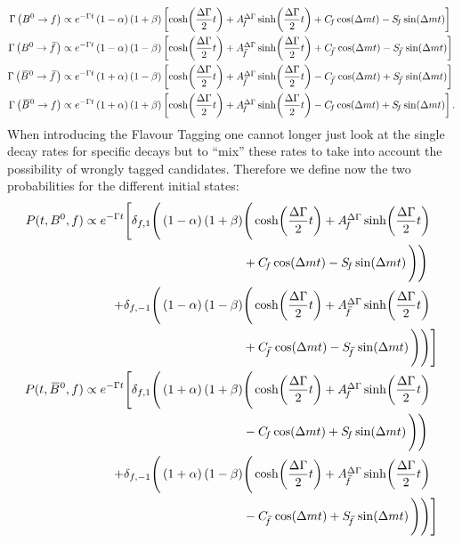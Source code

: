 \begin{align}
  \Gamma\left(\Bz\to f\right) &\propto e^{-\Gamma t}\left(1-\alpha\right)\left(1+\beta\right)\left[\cosh\!\left(\frac{\Delta\Gamma}{2}t\right)
  +\ADGf\sinh\!\left(\frac{\Delta\Gamma}{2}t\right)+\Cf\cos\!\left(\Delta mt\right)-\Sf\sin\!\left(\Delta mt\right)\right]\label{eq:asymmetries_one}\\
  \Gamma\left(\Bz\to \fbar\right) &\propto e^{-\Gamma t}\left(1-\alpha\right)\left(1-\beta\right)\left[\cosh\!\left(\frac{\Delta\Gamma}{2}t\right)
  +\ADGfbar\sinh\!\left(\frac{\Delta\Gamma}{2}t\right)+\Cfbar\cos\!\left(\Delta mt\right)-\Sfbar\sin\!\left(\Delta mt\right)\right]
  \label{eq:asymmetries_two}\\
  \Gamma\left(\Bzb\to \fbar\right) &\propto e^{-\Gamma t}\left(1+\alpha\right)\left(1-\beta\right)\left[\cosh\!\left(\frac{\Delta\Gamma}{2}t\right)
  +\ADGfbar\sinh\!\left(\frac{\Delta\Gamma}{2}t\right)-\Cfbar\cos\!\left(\Delta mt\right)+\Sfbar\sin\!\left(\Delta mt\right)\right]
  \label{eq:asymmetries_three}\\
  \Gamma\left(\Bzb\to f\right) &\propto e^{-\Gamma t}\left(1+\alpha\right)\left(1+\beta\right)\left[\cosh\!\left(\frac{\Delta\Gamma}{2}t\right)
  +\ADGf\sinh\!\left(\frac{\Delta\Gamma}{2}t\right)-\Cf\cos\!\left(\Delta mt\right)+\Sf\sin\!\left(\Delta mt\right)\right]\label{eq:asymmetries_four}.
\end{align}
When introducing the Flavour Tagging one cannot longer just look at the single decay rates for specific decays but to \enquote{mix} these
rates to take into account the possibility of wrongly tagged candidates. Therefore we define now the two probabilities for the different
initial states:
\begin{align*}
P(t,\Bz,f)\propto e^{-\Gamma t}
\Bigg[\delta_{f,1}
\Bigg(\left(1-\alpha\right)\left(1+\beta\right) &\Bigg(\cosh\!\left(\frac{\DG}{2}t\right)+\ADGf\sinh\!\left(\frac{\DG}{2}t\right)\\
&+\Cf\cos\!\left(\dm t\right)-\Sf\sin\!\left(\dm t\right)\Bigg)\Bigg)\\
+\delta_{f,-1}\Bigg(\left(1-\alpha\right)\left(1-\beta\right) &\Bigg(\cosh\!\left(\frac{\DG}{2}t\right)+\ADGfbar\sinh\!\left(\frac{\DG}{2}t\right)\\
&+\Cfbar\cos\!\left(\dm t\right)-\Sfbar\sin\!\left(\dm t\right)\Bigg)\Bigg)\Bigg]\\
P(t,\Bzb,f)\propto e^{-\Gamma t}
\Bigg[\delta_{f,1}
\Bigg(\left(1+\alpha\right)\left(1+\beta\right) &\Bigg(\cosh\!\left(\frac{\DG}{2}t\right)+\ADGf\sinh\!\left(\frac{\DG}{2}t\right)\\
&-\Cf\cos\!\left(\dm t\right)+\Sf\sin\!\left(\dm t\right)\Bigg)\Bigg)\\
+\delta_{f,-1}\Bigg(\left(1+\alpha\right)\left(1-\beta\right) &\Bigg(\cosh\!\left(\frac{\DG}{2}t\right)+\ADGfbar\sinh\!\left(\frac{\DG}{2}t\right)\\
&-\Cfbar\cos\!\left(\dm t\right)+\Sfbar\sin\!\left(\dm t\right)\Bigg)\Bigg)\Bigg]
\end{align*}
